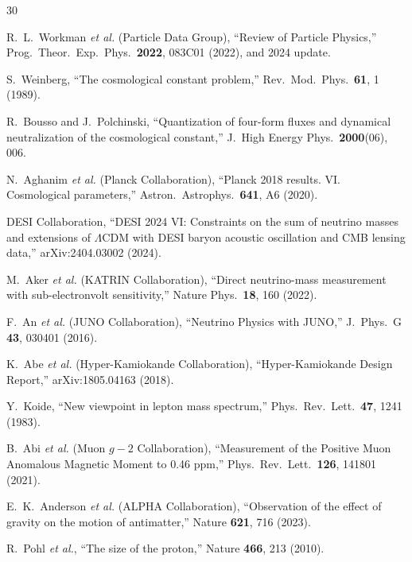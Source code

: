 \documentclass[aps,prd,twocolumn,superscriptaddress,longbibliography,nofootinbib]{revtex4-2}
\begin{document}
\begin{thebibliography}{30}

R.~L.~Workman \textit{et al.} (Particle Data Group),
``Review of Particle Physics,''
Prog.\ Theor.\ Exp.\ Phys.\ \textbf{2022}, 083C01 (2022),
and 2024 update.

S.~Weinberg,
``The cosmological constant problem,''
Rev.\ Mod.\ Phys.\ \textbf{61}, 1 (1989).

R.~Bousso and J.~Polchinski,
``Quantization of four-form fluxes and dynamical neutralization of the
cosmological constant,''
J.\ High Energy Phys.\ \textbf{2000}(06), 006.

N.~Aghanim \textit{et al.} (Planck Collaboration),
``Planck 2018 results. VI. Cosmological parameters,''
Astron.\ Astrophys.\ \textbf{641}, A6 (2020).

DESI Collaboration,
``DESI 2024 VI: Constraints on the sum of neutrino masses and
extensions of $\Lambda$CDM with DESI baryon acoustic oscillation
and CMB lensing data,''
arXiv:2404.03002 (2024).

M.~Aker \textit{et al.} (KATRIN Collaboration),
``Direct neutrino-mass measurement with sub-electronvolt sensitivity,''
Nature Phys.\ \textbf{18}, 160 (2022).

F.~An \textit{et al.} (JUNO Collaboration),
``Neutrino Physics with JUNO,''
J.\ Phys.\ G \textbf{43}, 030401 (2016).

K.~Abe \textit{et al.} (Hyper-Kamiokande Collaboration),
``Hyper-Kamiokande Design Report,''
arXiv:1805.04163 (2018).

Y.~Koide,
``New viewpoint in lepton mass spectrum,''
Phys.\ Rev.\ Lett.\ \textbf{47}, 1241 (1983).

B.~Abi \textit{et al.} (Muon $g-2$ Collaboration),
``Measurement of the Positive Muon Anomalous Magnetic Moment to
0.46 ppm,''
Phys.\ Rev.\ Lett.\ \textbf{126}, 141801 (2021).

E.~K.~Anderson \textit{et al.} (ALPHA Collaboration),
``Observation of the effect of gravity on the motion of antimatter,''
Nature \textbf{621}, 716 (2023).

R.~Pohl \textit{et al.},
``The size of the proton,''
Nature \textbf{466}, 213 (2010).


\end{thebibliography}
\end{document}
